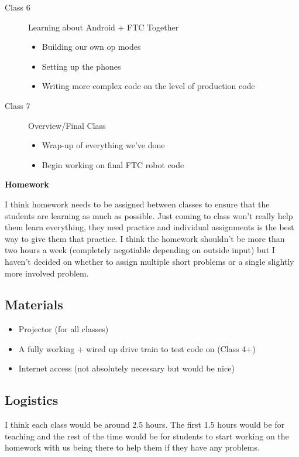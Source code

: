 \documentclass[11pt,fleqn]{article}
\theoremstyle{definition}
\begin{document}
\begin{description}
\item[Class 6] Learning about Android + FTC Together
\begin{itemize}
\item Building our own op modes
\item Setting up the phones
\item Writing more complex code on the level of production code
\end{itemize}

\item[Class 7] Overview/Final Class
\begin{itemize}
\item Wrap-up of everything we've done
\item Begin working on final FTC robot code
\end{itemize}
\end{description}

\begin{center}
\textbf{Homework}
\end{center}
I think homework needs to be assigned between classes to ensure that the students are learning as much as possible. Just coming to class won't really help them learn everything, they need practice and individual assignments is the best way to give them that practice. I think the homework shouldn't be more than two hours a week (completely negotiable depending on outside input) but I haven't decided on whether to assign multiple short problems or a single slightly more involved problem.

\begin{center}
\section*{Materials}
\end{center}
\begin{itemize}
\item
Projector (for all classes)
\item
A fully working + wired up drive train to test code on (Class 4+)
\item
Internet access (not absolutely necessary but would be nice)
\end{itemize}

\begin{center}
\section*{Logistics}
\end{center}
I think each class would be around 2.5 hours. The first 1.5 hours would be for teaching and the rest of the time would be for students to start working on the homework with us being there to help them if they have any problems.
\end{document}
